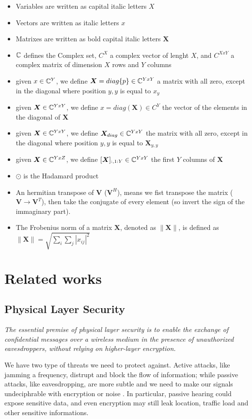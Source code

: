 \begin{itemize}
  \item Variables are written as capital italic letters $X$
  \item Vectors are written as italic letters $x$
  \item Matrixes are written as bold capital italic letters $\bm{X}$
  \item $\mathbb{C}$ defines the Complex set, $C^X$ a complex vector of lenght $X$, and $C^{XxY}$ a complex matrix of dimension $X$ rows and $Y$ columns
  \item given $x \in \mathbb{C}^Y$, we define $\bm{X} = diag\{p\} \in \mathbb{C}^{YxY}$ a matrix with all zero, except in the diagonal where position $y,y$ is equal to $x_y$
  \item given $\bm{X} \in \mathbb{C}^{YxY}$, we define $x = diag(\bm{X}) \in C^Y$ the vector of the elements in the diagonal of $\bm{X}$
  \item given $\bm{X} \in \mathbb{C}^{YxY}$, we define $\bm{X}_{diag} \in \mathbb{C}^{YxY}$ the matrix with all zero, except in the diagonal where position $y,y$ is equal to $\bm{X}_{y,y}$
  \item given $\bm{X} \in \mathbb{C}^{YxZ}$, we define $[\bm{X}]_{:,1:Y} \in \mathbb{C}^{YxY}$ the first $Y$ columns of $\bm{X}$
  \item $\odot$ is the Hadamard product
  \item An hermitian transpose of $\bm{V}$ ($\bm{V}^H$), means we fist transpose the matrix ($\bm{V} \rightarrow \bm{V}^T$), then take the conjugate of every element (so invert the sign of the immaginary part).
  \item The Frobenius norm of a matrix $\bm{X}$, denoted as $\|\bm{X}\|$, is defined as $\|\bm{X}\| = \sqrt{\sum_{i}\sum_{j} |x_{ij}|^2}$
\end{itemize}

\newpage
\section{Related works}
\subsection{Physical Layer Security}

\textit{The essential premise of physical layer security is to enable the exchange of confidential messages over a wireless medium in the presence of unauthorized eavesdroppers, without relying on higher-layer encryption.}\cite{6739367}

We have two type of threats we need to protect against. Active attacks, like jamming a frequency, distrupt and block the flow of information; while passive attacks, like eavesdropping, are more subtle and we need to make our signals undeciphrable with encryption or noise \cite{5751298}. In particular, passive hearing could expose sensitive data, and even encryption may still leak location, traffic load and other sensitive informations.

